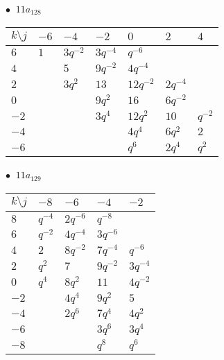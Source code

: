 \begin{minipage}{\linewidth}
$\bullet\ $ $11a_{128}$ \vspace{0.5em} \\
\begin{tabular}{l|llllll}
$k \setminus j$ & $-6$ & $-4$ & $-2$ & $0$ & $2$ & $4$ \\
\hline
$6$ & $1$ & $3q^{-2}$ & $3q^{-4}$ & $q^{-6}$ &  &  \\
$4$ &  & $5$ & $9q^{-2}$ & $4q^{-4}$ &  &  \\
$2$ &  & $3q^{2}$ & $13$ & $12q^{-2}$ & $2q^{-4}$ &  \\
$0$ &  &  & $9q^{2}$ & $16$ & $6q^{-2}$ &  \\
$-2$ &  &  & $3q^{4}$ & $12q^{2}$ & $10$ & $q^{-2}$ \\
$-4$ &  &  &  & $4q^{4}$ & $6q^{2}$ & $2$ \\
$-6$ &  &  &  & $q^{6}$ & $2q^{4}$ & $q^{2}$ \\
\end{tabular}
\vspace{2em}
\end{minipage}
%
\begin{minipage}{\linewidth}
$\bullet\ $ $11a_{129}$ \vspace{0.5em} \\
\begin{tabular}{l|llll}
$k \setminus j$ & $-8$ & $-6$ & $-4$ & $-2$ \\
\hline
$8$ & $q^{-4}$ & $2q^{-6}$ & $q^{-8}$ &  \\
$6$ & $q^{-2}$ & $4q^{-4}$ & $3q^{-6}$ &  \\
$4$ & $2$ & $8q^{-2}$ & $7q^{-4}$ & $q^{-6}$ \\
$2$ & $q^{2}$ & $7$ & $9q^{-2}$ & $3q^{-4}$ \\
$0$ & $q^{4}$ & $8q^{2}$ & $11$ & $4q^{-2}$ \\
$-2$ &  & $4q^{4}$ & $9q^{2}$ & $5$ \\
$-4$ &  & $2q^{6}$ & $7q^{4}$ & $4q^{2}$ \\
$-6$ &  &  & $3q^{6}$ & $3q^{4}$ \\
$-8$ &  &  & $q^{8}$ & $q^{6}$ \\
\end{tabular}
\vspace{2em}
\end{minipage}
%
